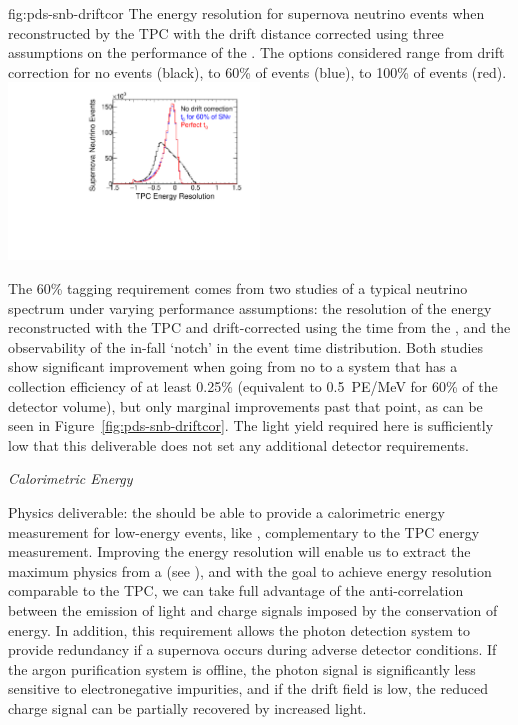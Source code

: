\begin{dunefigure}
{fig:pds-snb-driftcor}
{The energy resolution for supernova neutrino events when reconstructed by the TPC with the drift distance corrected using three assumptions on the performance of the . The options considered range from drift correction for no events (black), to 60\% of events (blue), to 100\% of events (red).
}
  \includegraphics[width=0.5\textwidth]{graphics/pds-snb-drift-corr}
 \end{dunefigure}

The 60\% \tzero tagging requirement comes from two studies of a typical  neutrino spectrum under varying  performance assumptions: the resolution of the energy reconstructed with the TPC and drift-corrected using the time from the , and the observability of the in-fall `notch' in the  event time distribution. Both studies show significant improvement when going from no  to a system that has a collection efficiency of at least 0.25\% (equivalent to \SI{0.5}{PE/MeV} for 60\% of the detector volume), but only marginal improvements past that point, as can be seen in Figure~\ref{fig:pds-snb-driftcor}. The light yield required here is sufficiently low that this deliverable does not set any additional detector requirements.


\textit{Calorimetric Energy}\nopagebreak

Physics deliverable: the  should be able to provide a calorimetric energy measurement for low-energy events, like , complementary to the TPC energy measurement. 
Improving the energy resolution will enable us to extract the maximum physics from a  (see \physchsnb{}), and with the goal to achieve energy resolution comparable to the TPC, we can take full advantage of the anti-correlation between the emission of light and charge signals imposed by the conservation of energy. In addition, this requirement allows the photon detection system to provide redundancy if a supernova occurs during adverse detector conditions. If the argon purification system is offline, the photon signal is significantly less sensitive to electronegative impurities, and if the drift field is low, the reduced charge signal can be partially recovered by increased light.

